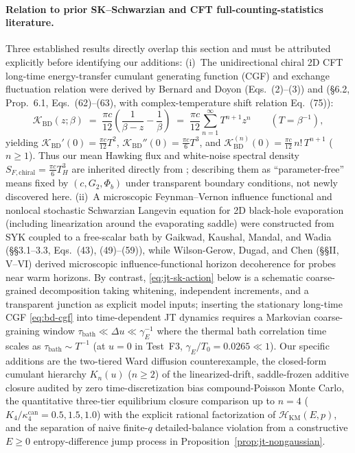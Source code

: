 \documentclass[11pt,a4paper]{article}
\theoremstyle{definition}
\theoremstyle{remark}
\newcommand{\1}{\mathbf{1}}
\begin{document}
\paragraph{Relation to prior SK--Schwarzian and CFT full-counting-statistics literature.}
Three established results directly overlap this section and must be attributed explicitly before identifying our additions:
(i)~The unidirectional chiral 2D CFT long-time energy-transfer cumulant generating function (CGF) and exchange fluctuation relation were derived by Bernard and Doyon \cite{BernardDoyon2012} (Eqs.~(2)--(3)) and \cite{BernardDoyon2015} (\S6.2, Prop.~6.1, Eqs.~(62)--(63), with complex-temperature shift relation Eq.~(75)):
\begin{equation}\label{eq:bd-cgf}
  \mathcal{K}_{\mathrm{BD}}(z;\beta) \;=\; \frac{\pi c}{12}\!\left(\frac{1}{\beta - z} - \frac{1}{\beta}\right)
  \;=\; \frac{\pi c}{12}\sum_{n=1}^\infty T^{n+1} z^n \qquad (T=\beta^{-1}),
\end{equation}
yielding $\mathcal{K}_{\mathrm{BD}}'(0)=\frac{\pi c}{12}T^2$, $\mathcal{K}_{\mathrm{BD}}''(0)=\frac{\pi c}{6}T^3$, and $\mathcal{K}_{\mathrm{BD}}^{(n)}(0)=\frac{\pi c}{12}\,n!\,T^{n+1}$ ($n\ge 1$). Thus our mean Hawking flux and white-noise spectral density $S_{F,\mathrm{chiral}}=\frac{\pi c}{6}T_H^3$ are inherited directly from \cite{BernardDoyon2012,BernardDoyon2015}; describing them as ``parameter-free'' means fixed by $(c,G_2,\Phi_b)$ under transparent boundary conditions, not newly discovered here.
(ii)~A microscopic Feynman--Vernon influence functional and nonlocal stochastic Schwarzian Langevin equation for 2D black-hole evaporation (including linearization around the evaporating saddle) were constructed from SYK coupled to a free-scalar bath by Gaikwad, Kaushal, Mandal, and Wadia \cite{Gaikwad2023} (\S\S3.1--3.3, Eqs.~(43), (49)--(59)), while Wilson-Gerow, Dugad, and Chen \cite{WilsonGerow2024} (\S\S II, V--VI) derived microscopic influence-functional horizon decoherence for probes near warm horizons. By contrast, \eqref{eq:jt-sk-action} below is a schematic coarse-grained decomposition taking whitening, independent increments, and a transparent junction as explicit model inputs; inserting the stationary long-time CGF \eqref{eq:bd-cgf} into time-dependent JT dynamics requires a Markovian coarse-graining window $\tau_{\mathrm{bath}} \ll \Delta u \ll \gamma_E^{-1}$ where the thermal bath correlation time scales as $\tau_{\mathrm{bath}}\sim T^{-1}$ (at $u=0$ in Test~F3, $\gamma_E/T_0 = 0.0265 \ll 1$). Our specific additions are the two-tiered Ward diffusion counterexample, the closed-form cumulant hierarchy $K_n(u)$ ($n\ge 2$) of the linearized-drift, saddle-frozen additive closure audited by zero time-discretization bias compound-Poisson Monte Carlo, the quantitative three-tier equilibrium closure comparison up to $n=4$ ($K_4/\kappa_4^{\mathrm{can}}=0.5, 1.5, 1.0$) with the explicit rational factorization of $\mathcal{H}_{\mathrm{KM}}(E,p)$, and the separation of naive finite-$q$ detailed-balance violation from a constructive $E\ge 0$ entropy-difference jump process in Proposition~\ref{prop:jt-nongaussian}.
\end{document}
